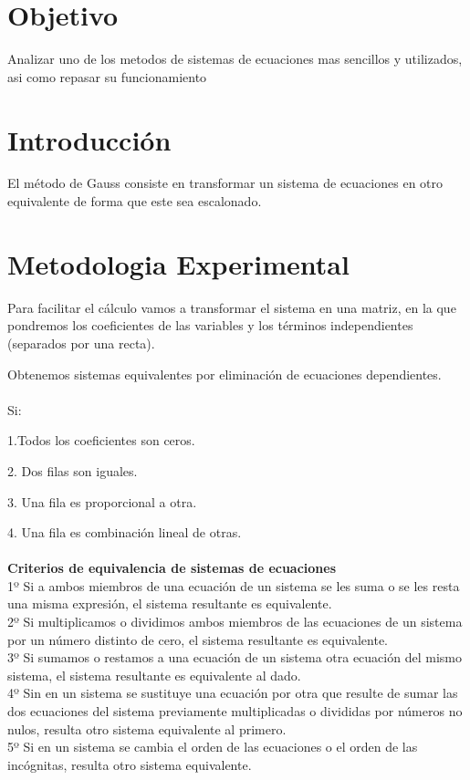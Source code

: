 \documentclass{article}
\begin{document}
\begin{multicols}{2}

\section{Objetivo}
\label{sec:obj}
  Analizar uno de los metodos de sistemas de ecuaciones mas sencillos y utilizados, asi como repasar su funcionamiento

\section{Introducción}
\label{sec:intro}
El método de Gauss consiste en transformar un sistema de ecuaciones en otro equivalente de forma que este sea escalonado.


\section{Metodologia Experimental}
\label{sec:Met}

Para facilitar el cálculo vamos a transformar el sistema en una matriz, en la que pondremos los coeficientes de las variables y los términos independientes (separados por una recta).

Obtenemos sistemas equivalentes por eliminación de ecuaciones dependientes. 
\\
\\
Si:

1.Todos los coeficientes son ceros.

2. Dos filas son iguales.

3. Una fila es proporcional a otra.

4. Una fila es combinación lineal de otras.
\\
\\
\textbf{Criterios de equivalencia de sistemas de ecuaciones}
\\
1º Si a ambos miembros de una ecuación de un sistema se les suma o se les resta una misma expresión, el sistema resultante es equivalente.
\\
2º Si multiplicamos o dividimos ambos miembros de las ecuaciones de un sistema por un número distinto de cero, el sistema resultante es equivalente.
\\
3º Si sumamos o restamos a una ecuación de un sistema otra ecuación del mismo sistema, el sistema resultante es equivalente al dado.
\\
4º Sin en un sistema se sustituye una ecuación por otra que resulte de sumar las dos ecuaciones del sistema previamente multiplicadas o divididas por números no nulos, resulta otro sistema equivalente al primero.
\\
5º Si en un sistema se cambia el orden de las ecuaciones o el orden de las incógnitas, resulta otro sistema equivalente.


\end{multicols}
\end{document}
